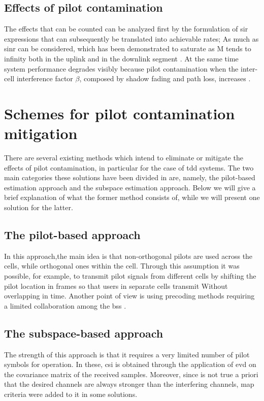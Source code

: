 \documentclass[11pt]{book}
\begin{document}
\subsection{Effects of pilot contamination}
The effects that can be counted can be analyzed first by the formulation of \gls{sir} expressions that can subsequently be translated into achievable rates; As much as \gls{sinr} can be considered, which has been demonstrated to saturate as M tends to infinity both in the uplink and in the downlink segment \cite{Elijah2016} \cite{Buzzi}. At the same time system performance degrades visibly because pilot contamination when the inter-cell interference factor $\beta$, composed by shadow fading and path loss, increases \cite{Elijah2016}.
\section{Schemes for pilot contamination mitigation}
There are several existing methods which intend to eliminate or mitigate the effects of pilot contamination, in particular for the case of \gls{tdd} systems. The two main categories these solutions have been divided in are, namely, the pilot-based estimation approach and the subspace estimation approach. Below we will give a brief explanation of what the former method consists of, while we will present one solution for the latter.

\subsection{The pilot-based approach}
In this approach,the main idea is that non-orthogonal pilots are used across the cells, while orthogonal ones within the cell. Through this assumption it was possible, for example, to transmit pilot signals from different cells by shifting the pilot location in frames so that users in separate cells transmit Without overlapping in time. Another point of view is using precoding methods requiring a limited collaboration among the \gls{bs}s \cite{Elijah2016}.
\subsection{The subspace-based approach}
The strength of this approach is that it requires a very limited number of pilot symbols for operation. In these, \gls{csi} is obtained through the application of \gls{evd} on the covariance matrix of the received samples. Moreover, since is not true a priori that the desired channels are always stronger than the interfering channels, \gls{map} criteria were added to it in some solutions.
\end{document}

